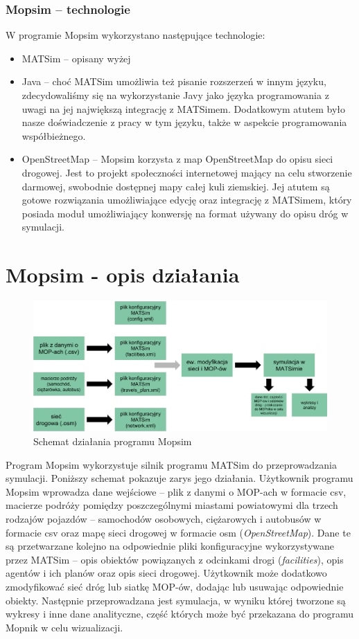 \subsubsection{Mopsim -- technologie}
W programie Mopsim wykorzystano następujące technologie:
\begin{itemize}
\item MATSim -- opisany wyżej
\item Java -- choć MATSim umożliwia też pisanie rozszerzeń w innym języku, zdecydowaliśmy się na wykorzystanie Javy jako języka programowania z uwagi na jej największą integrację z MATSimem. Dodatkowym atutem było nasze doświadczenie z pracy w tym języku, także w aspekcie programowania współbieżnego.
\item OpenStreetMap\cite{osm} -- Mopsim korzysta z map OpenStreetMap do opisu sieci drogowej. Jest to projekt społeczności internetowej mający na celu stworzenie darmowej, swobodnie dostępnej mapy całej kuli ziemskiej. Jej atutem są gotowe rozwiązania umożliwiające edycję oraz integrację z MATSimem, który posiada moduł umożliwiający konwersję na format używany do opisu dróg w symulacji.
\end{itemize}
\section{Mopsim - opis działania}
    \begin{figure}[h]
        \caption{Schemat działania programu Mopsim}
        \includegraphics[width=\textwidth]{images/mopsim/mopsim-workflow.png}
    \end{figure}
Program Mopsim wykorzystuje silnik programu MATSim do przeprowadzania
symulacji. Poniższy schemat pokazuje zarys jego działania. Użytkownik programu
Mopsim wprowadza dane wejściowe -- plik z danymi o MOP-ach w formacie csv,
macierze podróży pomiędzy poszczególnymi miastami powiatowymi dla trzech
rodzajów pojazdów -- samochodów osobowych, ciężarowych i autobusów w formacie
csv oraz mapę sieci drogowej w formacie \acrshort{osm}
(\textit{OpenStreetMap}\cite{osm}). Dane te są przetwarzane kolejno na odpowiednie pliki konfiguracyjne wykorzystywane przez MATSim -- opis obiektów powiązanych z odcinkami drogi (\textit{facilities}), opis agentów i ich planów oraz opis sieci drogowej. Użytkownik może dodatkowo zmodyfikować sieć dróg lub siatkę MOP-ów, dodając lub usuwając odpowiednie obiekty. Następnie przeprowadzana jest symulacja, w wyniku której tworzone są wykresy i inne dane analityczne, część których może być przekazana do programu Mopnik w celu wizualizacji.

